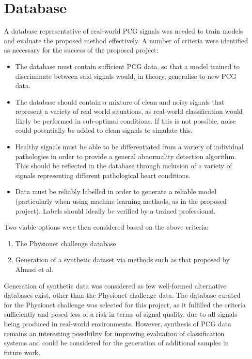 \documentclass[titlepage, 12pt]{scrartcl} \usepackage{enumitem}
\begin{document}
\section{Database}\label{Database}
A database representative of real-world PCG signals was needed to train models
and evaluate the proposed method effectively.  A number of criteria were
identified as necessary for the success of the proposed project:
\begin{itemize}
    \item The database must contain sufficient PCG data, so that a model
        trained to discriminate between said signals would, in theory, generalise
        to new PCG data.
    \item The database should contain a mixture of clean and noisy signals that
        represent a variety of real world situations, as real-world
        classification would likely be performed in sub-optimal conditions. If
        this is not possible, noise could potentially be added to clean signals
        to simulate this.
    \item Healthy signals must be able to be differentiated from a variety of
        individual pathologies in order to provide a general abnormality
        detection algorithm. This should be reflected in the database through
        inclusion of a variety of signals representing different pathological
        heart conditions.
    \item Data must be reliably labelled in order to generate a reliable model
        (particularly when using machine learning methods, as in the proposed
        project). Labels should ideally be verified by a trained professional.
\end{itemize}
\noindent
Two viable options were then considered based on the above criteria:
\begin{enumerate}
    \item The Physionet challenge database
    \item Generation of a synthetic dataset via methods such as that proposed
    by Almasi et al.~\parencite{Almasi2011}
\end{enumerate}

Generation of synthetic data was considered as few well-formed alternative
databases exist, other than the Physionet challenge data. The database curated
for the Physionet challenge was selected for this project, as it fulfilled the
criteria sufficiently and posed less of a risk in terms of signal quality, due
to all signals being produced in real-world environments. However, synthesis
of PCG data remains an interesting possibility for improving evaluation of
classification systems and could be considered for the generation of additional
samples in future work.
\end{document}
